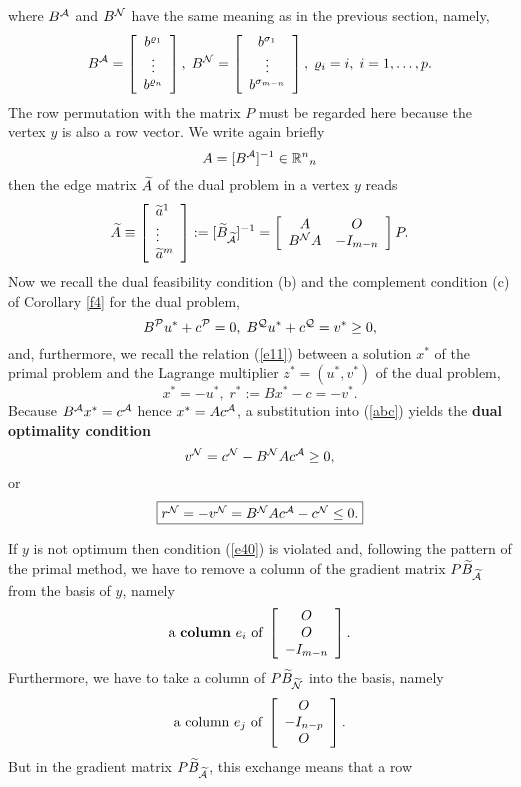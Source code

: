 where $B^{\A}$ and $B^{\N}$ have the same meaning as in
the previous section, namely,
\[
B^{\A} = \ba{[}{c} b^{\rho _{1}}\\ \vdots \\ b^{\rho
_n}\ea{]},
\; B^{\N} = \ba{[}{c}b^{\sigma _1} \\ \vdots \\ b^{\sigma _{m-n}} \ea{]},
\; \rho _i = i, \; i = 1, \ldots, p.
\]
The row permutation with the matrix $P$ must be regarded here because the
vertex $y$ is also a row vector. We write again briefly
%
\[
A = [B^{\A}]^{-1} \in \Bbb{R}^n{}_n
\]
then the edge matrix $\wi{A}$ of the dual problem in a vertex $y$
reads
\begin{equation} \label{aaa1}
\wi{A} \equiv \ba{[}{l}\wi{a}^1\\\vdots\\ \wi{a}^m\ea{]}
:= [\wi{B}_{\wi{\A}}]^{-1} =
\ba{[}{cc} A & O\\B^{\N}A & -I_{m-n}\ea{]}P.
\end{equation}
Now we recall the dual feasibility condition (b) and the complement condition
(c) of Corollary \ref{f4} for the dual problem,
\begin{equation} \label{abc}
 B^{\P}u^* + c^{\P} = 0, \; B^{\Q}u^*  +c^{\Q} = v^* \geq 0,
\end{equation}
%
and, furthermore, we recall the relation (\ref{e11}) between a solution $x^*$
of the primal problem and the {\sc Lagrange} multiplier $z^* = (u^*,v^*)$ of
the dual problem,
\[
x^* = - u^*, \; r^* := Bx^* - c = - v^*.
\]
Because $B^{\A}x^* = c^{\A}$ hence $x^* = Ac^{\A}$, a substitution into
(\ref{abc}) yields the {\bf dual optimality  condition}
%
\[
v^{\N} = c^{\N} - B^{\N}Ac^{\A} \geq 0,
\]
or
%
\begin{equation} \label{e40}
\fbox{$
r^{\N} = - v^{\N} = B^{\N}Ac^{\A} - c^{\N} \leq 0.
$}
\end{equation}
\par
If $y$ is not optimum then condition (\ref{e40}) is violated and, following
the pattern of the primal method,  we have to remove a column of the
gradient matrix $P\wi{B}_{\wi{\A}}$ from the basis of $y$, namely
\[
\mbox{a {\bf column} $e_i$ of}  \; \ba{[}{c}O\\ O\\- I_{m-n}\ea{]}.
\]
Furthermore, we have to take a column of $P\wi{B}_{\wi{\N}}$ into the basis,
namely
\[
\mbox{a column $e_j$ of} \; \ba{[}{c} O\\ - I_{n-p}\\ O \ea{]}.
\]
But in the gradient matrix $P\wi{B}_{\wi{\A}}$, this exchange means that a row

